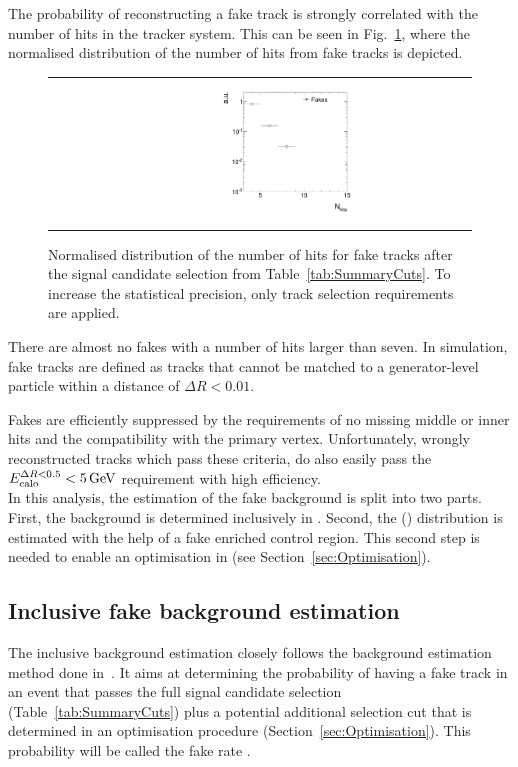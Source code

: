 The probability of reconstructing a fake track is strongly correlated with the number of hits in the tracker system.
This can be seen in Fig.~\ref{fig:NValidFakes}, where the normalised distribution of the number of hits from fake tracks is depicted.
\begin{figure}[!b]
  \centering 
  \begin{tabular}{c}
    \includegraphics[width=0.49\textwidth]{figures/analysis/Background/NValidForFakes_chiTracksfullSelectionNoTriggerCuts.pdf}
  \end{tabular}
  \caption{Normalised distribution of the number of hits for fake tracks after the signal candidate selection from Table~\ref{tab:SummaryCuts}.
           To increase the statistical precision, only track selection requirements are applied.}
  \label{fig:NValidFakes}
\end{figure}
There are almost no fakes with a number of hits larger than seven.
In simulation, fake tracks are defined as tracks that cannot be matched to a generator-level particle within a distance of $\Delta R < 0.01$.

Fakes are efficiently suppressed by the requirements of no missing middle or inner hits and the compatibility with the primary vertex.
Unfortunately, wrongly reconstructed tracks which pass these criteria, do also easily pass the $E^{\Delta R<0.5}_{\text{calo}}<5\,\text{Ge}\kern-0.06667em\text{V}$ requirement with high efficiency.\\

In this analysis, the estimation of the fake background is split into two parts.
First, the background is determined inclusively in \dedx.
Second, the \dedx (\ias) distribution is estimated with the help of a fake enriched control region. 
This second step is needed to enable an optimisation in \dedx (see Section~\ref{sec:Optimisation}).

\subsection{Inclusive fake background estimation}
The inclusive background estimation closely follows the background estimation method done in~\cite{bib:CMS:DT_Thesis,bib:CMS:DT_8TeV_AN}.
It aims at determining the probability of having a fake track in an event that passes the full signal candidate selection (Table~\ref{tab:SummaryCuts}) plus a potential additional \pt selection cut that is determined in an
optimisation procedure (Section~\ref{sec:Optimisation}).
This probability will be called the fake rate \fakerate.

